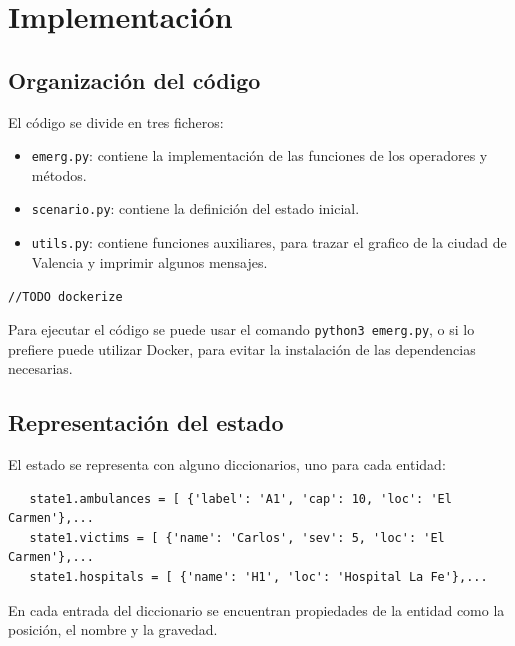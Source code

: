 \section{Implementación}

\subsection{Organización del código}
El código se divide en tres ficheros:
\begin{itemize}
   \item \texttt{emerg.py}: contiene la implementación de las funciones de los operadores y métodos.
   \item \texttt{scenario.py}: contiene la definición del estado inicial.
   \item \texttt{utils.py}: contiene funciones auxiliares, para trazar el grafico de la ciudad de Valencia y imprimir algunos mensajes.
\end{itemize}

\texttt{//TODO dockerize}

Para ejecutar el código se puede usar el comando \texttt{python3 emerg.py}, o si lo prefiere puede utilizar Docker, para evitar la instalación de las dependencias necesarias.

\subsection{Representación del estado}
El estado se representa con alguno diccionarios, uno para cada entidad:
\begin{lstlisting}
   state1.ambulances = [ {'label': 'A1', 'cap': 10, 'loc': 'El Carmen'},...
   state1.victims = [ {'name': 'Carlos', 'sev': 5, 'loc': 'El Carmen'},...
   state1.hospitals = [ {'name': 'H1', 'loc': 'Hospital La Fe'},...
\end{lstlisting}
En cada entrada del diccionario se encuentran propiedades de la entidad como la posición, el nombre y la gravedad.

